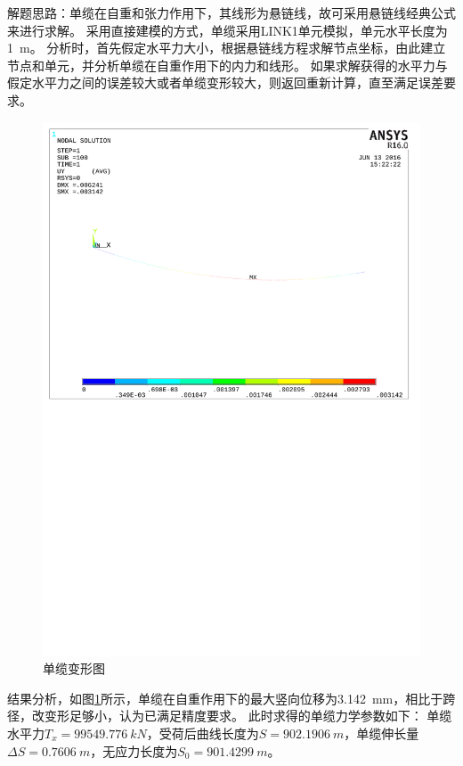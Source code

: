 \documentclass{article}
\begin{document}
解题思路：单缆在自重和张力作用下，其线形为悬链线，故可采用悬链线经典公式来进行求解。
采用直接建模的方式，单缆采用LINK1单元模拟，单元水平长度为\SI{1}{m}。
分析时，首先假定水平力大小，根据悬链线方程求解节点坐标，由此建立节点和单元，并分析单缆在自重作用下的内力和线形。
如果求解获得的水平力与假定水平力之间的误差较大或者单缆变形较大，则返回重新计算，直至满足误差要求。



\begin{figure}[!h]
  \centering
  \label{fig:result}
  \includegraphics[width=\textwidth]{fig/disp.pdf}
  \caption{单缆变形图}
\end{figure}

结果分析，如图\ref{fig:result}所示，单缆在自重作用下的最大竖向位移为\SI{3.142}{mm}，相比于跨径，改变形足够小，认为已满足精度要求。
此时求得的单缆力学参数如下：
单缆水平力$T_x = \SI{99549.776}{kN}$，受荷后曲线长度为$S=\SI{902.1906}{m}$，单缆伸长量$\Delta S=\SI{0.7606}{m}$，无应力长度为$S_0 = \SI{901.4299}{m}$。
\end{document}
